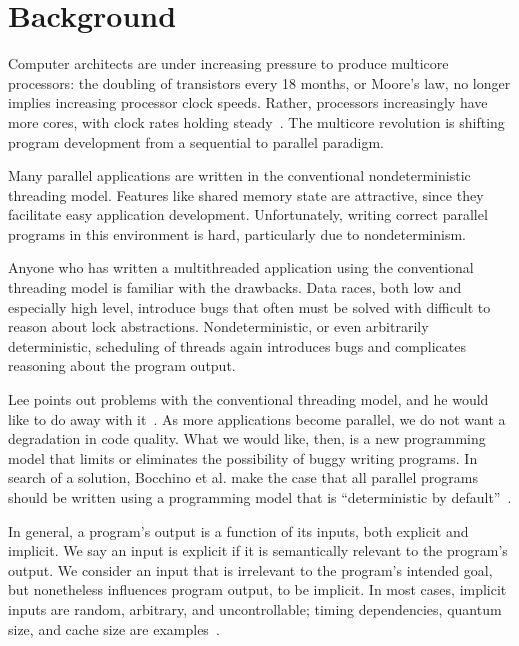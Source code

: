 
\section{Background}

Computer architects are under increasing pressure to produce multicore
processors: the doubling of transistors every 18 months, or Moore's law, no
longer implies increasing processor clock speeds. Rather, processors
increasingly have more cores, with clock rates holding
steady~\cite{bandwidth2005multicore}. The multicore revolution is shifting
program development from a sequential to parallel paradigm.

Many parallel applications are written in the conventional nondeterministic
threading model. Features like shared memory state are attractive, since they
facilitate easy application development. Unfortunately, writing correct parallel
programs in this environment is hard, particularly due to nondeterminism.

Anyone who has written a multithreaded
application using the conventional threading model is familiar with the
drawbacks. Data races, both low and especially high level, introduce bugs that
often must be solved with difficult to reason about lock abstractions.
Nondeterministic, or even arbitrarily deterministic, scheduling of threads again
introduces bugs and complicates reasoning about the program output.

Lee points out problems with the conventional threading model, and he
would like to do away with it~\cite{lee2006problem}. As more applications
become parallel, we do not want a degradation in code quality. What we would
like, then, is a new programming model that limits or eliminates the possibility
of buggy writing programs. In search of a solution, Bocchino et al. make the
case that all parallel programs should be written using a programming model that
is ``deterministic by default''~\cite{bocchino2009parallel}.

\iffalse
\paragraph{Determinism}
\fi
In general, a program's output is a function of its inputs, both explicit and
implicit. We say an input is explicit if it is semantically relevant to the
program's output. We consider an input that is irrelevant to the program's
intended goal, but nonetheless influences program output, to be implicit. In
most cases, implicit inputs are random, arbitrary, and uncontrollable; timing
dependencies, quantum size, and cache size are examples~\cite{Bergan11}.

